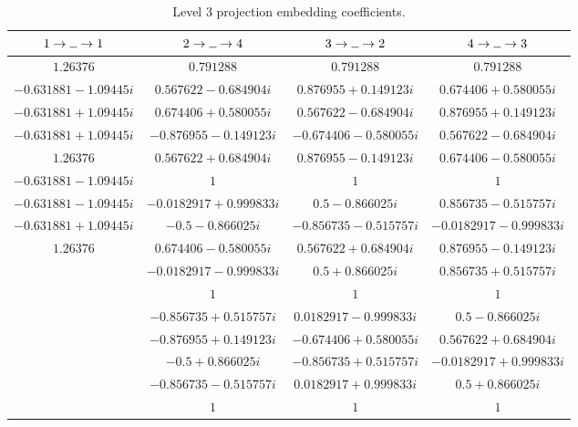 \begin{table}
    \centering
    \begin{tabular}{|cccc|} \hline
        $1\to\blank\to1$                    & $2\to\blank\to4$                  & $3\to\blank\to2$               & $4\to\blank\to3$ \\ \hline\hline
        $1.26376$              & $0.791288$                & $0.791288 $              & $0.791288$ \\
        $-0.631881-1.09445 i$   & $0.567622 - 0.684904 i$   & $0.876955 + 0.149123 i$  & $0.674406 + 0.580055 i$ \\
        $-0.631881+1.09445 i$   & $0.674406 + 0.580055 i$   & $0.567622 - 0.684904 i$  & $0.876955 + 0.149123 i$ \\
        $-0.631881+1.09445 i$   & $-0.876955 - 0.149123 i$  & $-0.674406 - 0.580055 i$ & $0.567622 - 0.684904 i$ \\
        $1.26376$               & $0.567622 + 0.684904 i$   & $0.876955 - 0.149123 i$ & $0.674406 - 0.580055 i$ \\
        $-0.631881-1.09445 i$   & $1$                       & $1$                      & $1$ \\
        $-0.631881-1.09445 i$   & $-0.0182917 + 0.999833 i$ & $0.5 - 0.866025 i$       & $0.856735 - 0.515757 i$ \\
        $-0.631881+1.09445i$    & $-0.5 - 0.866025 i$       & $-0.856735 - 0.515757 i$ & $-0.0182917 - 0.999833 i$ \\
        $1.26376$               & $0.674406 - 0.580055 i$   & $0.567622 + 0.684904 i$  & $0.876955 - 0.149123 i$ \\ 
                              & $-0.0182917 - 0.999833 i$ & $0.5 + 0.866025 i$       & $0.856735 + 0.515757 i$ \\
                              & $1$                       & $1$                      & $1$ \\
                              & $-0.856735 + 0.515757 i$  & $0.0182917 - 0.999833 i$ & $0.5 - 0.866025 i$ \\
                              & $-0.876955 + 0.149123 i$  & $-0.674406 + 0.580055 i$ & $0.567622 + 0.684904 i$ \\
                              & $-0.5 + 0.866025 i$       & $-0.856735 + 0.515757 i$ & $-0.0182917 + 0.999833 i$ \\
                              & $-0.856735 - 0.515757 i$  & $0.0182917 + 0.999833 i$ & $0.5 + 0.866025 i$ \\
                              & $1$                       & $1$                      & $1$ \\ \hline
    \end{tabular}
    \caption{Level 3 projection embedding coefficients.}
    \label{tab:lvl-3-proj-coefs}
\end{table}

